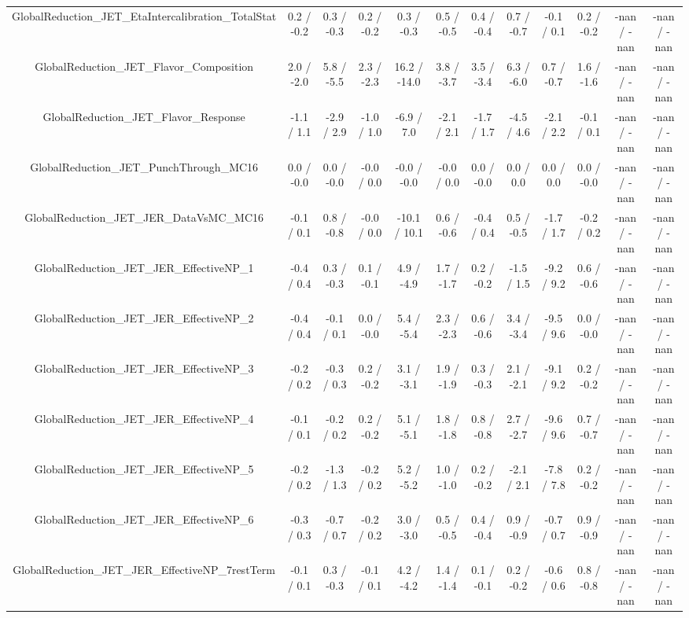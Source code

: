 \begin{table}[htbp]
\begin{center}
\begin{tabular}{|c|c|c|c|c|c|c|c|c|c|c|c|}
  GlobalReduction_JET_EtaIntercalibration_TotalStat & 0.2 / -0.2 & 0.3 / -0.3 & 0.2 / -0.2 & 0.3 / -0.3 & 0.5 / -0.5 & 0.4 / -0.4 & 0.7 / -0.7 & -0.1 / 0.1 & 0.2 / -0.2 & -nan / -nan & -nan / -nan \\ 
  GlobalReduction_JET_Flavor_Composition & 2.0 / -2.0 & 5.8 / -5.5 & 2.3 / -2.3 & 16.2 / -14.0 & 3.8 / -3.7 & 3.5 / -3.4 & 6.3 / -6.0 & 0.7 / -0.7 & 1.6 / -1.6 & -nan / -nan & -nan / -nan \\ 
  GlobalReduction_JET_Flavor_Response & -1.1 / 1.1 & -2.9 / 2.9 & -1.0 / 1.0 & -6.9 / 7.0 & -2.1 / 2.1 & -1.7 / 1.7 & -4.5 / 4.6 & -2.1 / 2.2 & -0.1 / 0.1 & -nan / -nan & -nan / -nan \\ 
  GlobalReduction_JET_PunchThrough_MC16 & 0.0 / -0.0 & 0.0 / -0.0 & -0.0 / 0.0 & -0.0 / -0.0 & -0.0 / 0.0 & 0.0 / -0.0 & 0.0 / 0.0 & 0.0 / 0.0 & 0.0 / -0.0 & -nan / -nan & -nan / -nan \\ 
  GlobalReduction_JET_JER_DataVsMC_MC16 & -0.1 / 0.1 & 0.8 / -0.8 & -0.0 / 0.0 & -10.1 / 10.1 & 0.6 / -0.6 & -0.4 / 0.4 & 0.5 / -0.5 & -1.7 / 1.7 & -0.2 / 0.2 & -nan / -nan & -nan / -nan \\ 
  GlobalReduction_JET_JER_EffectiveNP_1 & -0.4 / 0.4 & 0.3 / -0.3 & 0.1 / -0.1 & 4.9 / -4.9 & 1.7 / -1.7 & 0.2 / -0.2 & -1.5 / 1.5 & -9.2 / 9.2 & 0.6 / -0.6 & -nan / -nan & -nan / -nan \\ 
  GlobalReduction_JET_JER_EffectiveNP_2 & -0.4 / 0.4 & -0.1 / 0.1 & 0.0 / -0.0 & 5.4 / -5.4 & 2.3 / -2.3 & 0.6 / -0.6 & 3.4 / -3.4 & -9.5 / 9.6 & 0.0 / -0.0 & -nan / -nan & -nan / -nan \\ 
  GlobalReduction_JET_JER_EffectiveNP_3 & -0.2 / 0.2 & -0.3 / 0.3 & 0.2 / -0.2 & 3.1 / -3.1 & 1.9 / -1.9 & 0.3 / -0.3 & 2.1 / -2.1 & -9.1 / 9.2 & 0.2 / -0.2 & -nan / -nan & -nan / -nan \\ 
  GlobalReduction_JET_JER_EffectiveNP_4 & -0.1 / 0.1 & -0.2 / 0.2 & 0.2 / -0.2 & 5.1 / -5.1 & 1.8 / -1.8 & 0.8 / -0.8 & 2.7 / -2.7 & -9.6 / 9.6 & 0.7 / -0.7 & -nan / -nan & -nan / -nan \\ 
  GlobalReduction_JET_JER_EffectiveNP_5 & -0.2 / 0.2 & -1.3 / 1.3 & -0.2 / 0.2 & 5.2 / -5.2 & 1.0 / -1.0 & 0.2 / -0.2 & -2.1 / 2.1 & -7.8 / 7.8 & 0.2 / -0.2 & -nan / -nan & -nan / -nan \\ 
  GlobalReduction_JET_JER_EffectiveNP_6 & -0.3 / 0.3 & -0.7 / 0.7 & -0.2 / 0.2 & 3.0 / -3.0 & 0.5 / -0.5 & 0.4 / -0.4 & 0.9 / -0.9 & -0.7 / 0.7 & 0.9 / -0.9 & -nan / -nan & -nan / -nan \\ 
  GlobalReduction_JET_JER_EffectiveNP_7restTerm & -0.1 / 0.1 & 0.3 / -0.3 & -0.1 / 0.1 & 4.2 / -4.2 & 1.4 / -1.4 & 0.1 / -0.1 & 0.2 / -0.2 & -0.6 / 0.6 & 0.8 / -0.8 & -nan / -nan & -nan / -nan \\ 

\end{tabular}
\end{center}
\end{table}
